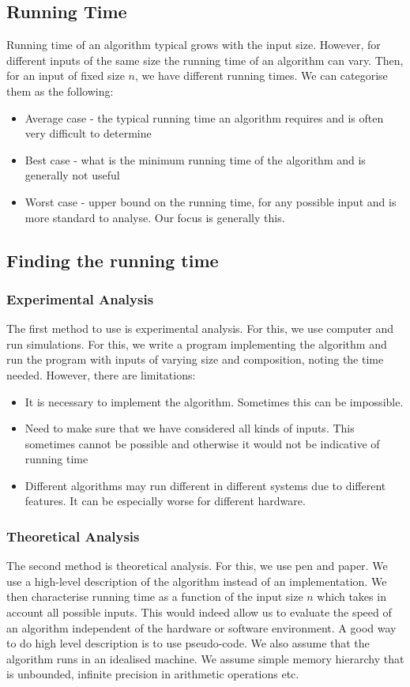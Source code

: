 \documentclass[a4paper]{article}
\theoremstyle{plain}
\theoremstyle{definition}
\theoremstyle{remark}
\begin{document}
\subsection{Running Time}
Running time of an algorithm typical grows with the input size. However, for different inputs of the same size the running time of an algorithm can vary. Then, for an input of fixed size $n$, we have different running times. We can categorise them as the following:
\begin{itemize}
	\item Average case - the typical running time an algorithm requires and is often very difficult to determine
	\item Best case - what is the minimum running time of the algorithm and is generally not useful
	\item Worst case - upper bound on the running time, for any possible input and is more standard to analyse. Our focus is generally this.
\end{itemize}
\subsection{Finding the running time}
\subsubsection{Experimental Analysis}
The first method to use is experimental analysis. For this, we use computer and run simulations. For this, we write a program implementing the algorithm and run the program with inputs of varying size and composition, noting the time needed. However, there are limitations:
\begin{itemize}
	\item It is necessary to implement the algorithm. Sometimes this can be impossible.
	\item Need to make sure that we have considered all kinds of inputs. This sometimes cannot be possible and otherwise it would not be indicative of running time
	\item Different algorithms may run different in different systems due to different features. It can be especially worse for different hardware.
\end{itemize}
\subsubsection{Theoretical Analysis}
The second method is theoretical analysis. For this, we use pen and paper. We use a high-level description of the algorithm instead of an implementation. We then characterise running time as a function of the input size $n$ which takes in account all possible inputs. This would indeed allow us to evaluate the speed of an algorithm independent of the hardware or software environment. A good way to do high level description is to use pseudo-code. We also assume that the algorithm runs in an idealised machine. We assume simple memory hierarchy that is unbounded, infinite precision in arithmetic operations etc. 
\end{document}
